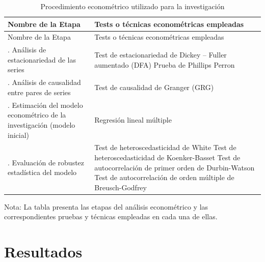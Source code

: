 \documentclass[
  jou,
  floatsintext,
  longtable,
  a4paper,
  nolmodern,
  notxfonts,
  notimes,
  12pt,
  colorlinks=true,linkcolor=blue,citecolor=blue,urlcolor=blue]{apa7}
\begin{document}
\begin{ThreePartTable}

\begin{longtable}[]{@{}
  >{\raggedright\arraybackslash}p{}
  >{\raggedright\arraybackslash}p{}@{}}
\caption{Procedimiento econométrico utilizado para la
investigación}\label{tbl-1}\tabularnewline
\toprule\noalign{}
\begin{minipage}[b]{\linewidth}\raggedright
Nombre de la Etapa
\end{minipage} & \begin{minipage}[b]{\linewidth}\raggedright
Tests o técnicas econométricas empleadas
\end{minipage} \\
\midrule\noalign{}
\endfirsthead
\toprule\noalign{}
\begin{minipage}[b]{\linewidth}\raggedright
Nombre de la Etapa
\end{minipage} & \begin{minipage}[b]{\linewidth}\raggedright
Tests o técnicas econométricas empleadas
\end{minipage} \\
\midrule\noalign{}
\endhead
\bottomrule\noalign{}
\endlastfoot
1. Análisis de estacionariedad de las series & Test de estacionariedad
de Dickey -- Fuller aumentado (DFA) Prueba de Phillips Perron \\
2. Análisis de causalidad entre pares de series & Test de causalidad de
Granger (GRG) \\
3. Estimación del modelo econométrico de la investigación (modelo
inicial) & Regresión lineal múltiple \\
4. Evaluación de robustez estadística del modelo & Test de
heteroscedasticidad de White Test de heteroscedasticidad de
Koenker-Basset Test de autocorrelación de primer orden de Durbin-Watson
Test de autocorrelación de orden múltiple de Breusch-Godfrey \\
\end{longtable}

\end{ThreePartTable}

Nota: La tabla presenta las etapas del análisis econométrico y las
correspondientes pruebas y técnicas empleadas en cada una de ellas.

\section{Resultados}\label{sec-resultados}
\end{document}
